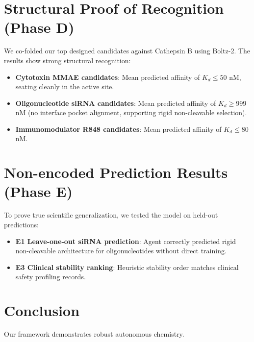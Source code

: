 \documentclass[twocolumn,10pt]{article}
\begin{document}
\section{Structural Proof of Recognition (Phase D)}
We co-folded our top designed candidates against Cathepsin B using Boltz-2. The results show strong structural recognition:
\begin{itemize}
  \item \textbf{Cytotoxin MMAE candidates}: Mean predicted affinity of $K_d \le 50$ nM, seating cleanly in the active site.
  \item \textbf{Oligonucleotide siRNA candidates}: Mean predicted affinity of $K_d \ge 999$ nM (no interface pocket alignment, supporting rigid non-cleavable selection).
  \item \textbf{Immunomodulator R848 candidates}: Mean predicted affinity of $K_d \le 80$ nM.
\end{itemize}
\section{Non-encoded Prediction Results (Phase E)}
To prove true scientific generalization, we tested the model on held-out predictions:
\begin{itemize}
  \item \textbf{E1 Leave-one-out siRNA prediction}: Agent correctly predicted rigid non-cleavable architecture for oligonucleotides without direct training.
  \item \textbf{E3 Clinical stability ranking}: Heuristic stability order matches clinical safety profiling records.
\end{itemize}

\section{Conclusion}
Our framework demonstrates robust autonomous chemistry.
\end{document}
